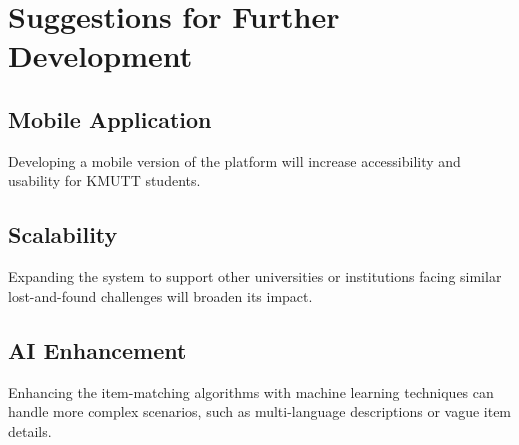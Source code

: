 \section{Suggestions for Further Development}
\subsection{Mobile Application}
Developing a mobile version of the platform will increase accessibility and usability for KMUTT students.

\subsection{Scalability}
Expanding the system to support other universities or institutions facing similar lost-and-found challenges will broaden its impact.

\subsection{AI Enhancement}
Enhancing the item-matching algorithms with machine learning techniques can handle more complex scenarios, such as multi-language descriptions or vague item details.
